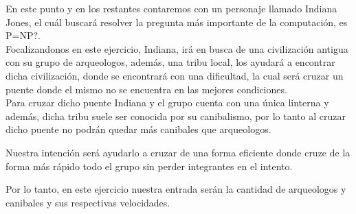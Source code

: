 En este punto y en los restantes contaremos con un personaje llamado Indiana Jones, el cu\'al buscar\'a resolver la pregunta m\'as importante de la computaci\'on, es P=NP?.\\

Focalizandonos en este ejercicio, Indiana, ir\'a en busca de una civilizaci\'on antigua con su grupo de arqueologos, adem\'as, una tribu local, los ayudar\'a a encontrar dicha civilizaci\'on, donde se encontrar\'a con una dificultad, la cual ser\'a cruzar un puente donde el mismo no se encuentra en las mejores condiciones.\\

Para cruzar dicho puente Indiana y el grupo cuenta con una \'unica linterna y adem\'as, dicha tribu suele ser conocida por su canibalismo, por lo tanto al cruzar dicho puente no podr\'an quedar m\'as canibales que arqueologos.

Nuestra intenci\'on ser\'a ayudarlo a cruzar de una forma eficiente donde cruze de la forma m\'as r\'apido todo el grupo sin perder integrantes en el intento.

Por lo tanto, en este ejercicio nuestra entrada ser\'an la cantidad de arqueologos y canibales y sus respectivas velocidades.


